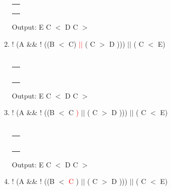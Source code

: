 \documentclass[a4paper]{article}
\begin{document}
\begin{large}
\begin{enumerate}
\begin{tabular}[t]{ | p{1.6em} | }
            \makecell{}       \\ \hline
            \makecell{)}      \\ \hline
            \makecell{)}      \\ \hline
            \makecell{ $||$ } \\ \hline
          \end{tabular}
          \hspace{2em}
          Output: E C $<$ D C $>$
          \newpage
    \item
          ! (A \&\& ! ((B $<$ C) \textcolor{red}{ $||$} ( C $>$ D ))) $||$ ( C $<$ E)\\
          \\
          \begin{tabular}[t]{ | p{1.6em} | }
            \makecell{ }      \\ \hline
            \makecell{}       \\ \hline
            \makecell{$||$}   \\ \hline
            \makecell{)}      \\ \hline
            \makecell{)}      \\ \hline
            \makecell{ $||$ } \\ \hline
          \end{tabular}
          \hspace{2em}
          Output: E C $<$ D C $>$
    \item
          ! (A \&\& ! ((B $<$ C \textcolor{red}{ )} $||$ ( C $>$ D ))) $||$ ( C $<$ E)\\
          \\
          \begin{tabular}[t]{ | p{1.6em} | }
            \makecell{ }      \\ \hline
            \makecell{)}      \\ \hline
            \makecell{$||$}   \\ \hline
            \makecell{)}      \\ \hline
            \makecell{)}      \\ \hline
            \makecell{ $||$ } \\ \hline
          \end{tabular}
          \hspace{2em}
          Output: E C $<$ D C $>$
    \item
          ! (A \&\& ! ((B $<$  \textcolor{red}{C} ) $||$ ( C $>$ D ))) $||$ ( C $<$ E)\\
          \\

\end{enumerate}
\end{large}
\end{document}
